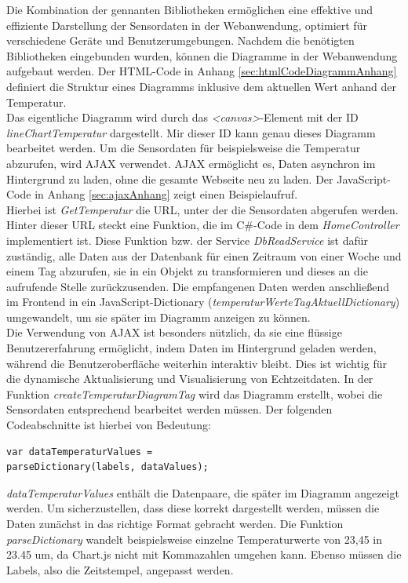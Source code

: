 \documentclass[conference]{IEEEtran}
\begin{document}
Die Kombination der gennanten Bibliotheken ermöglichen eine effektive und effiziente Darstellung der Sensordaten in der Webanwendung, optimiert für verschiedene Geräte und Benutzerumgebungen.
Nachdem die benötigten Bibliotheken eingebunden wurden, können die Diagramme in der Webanwendung aufgebaut werden. Der  HTML-Code in Anhang \ref{sec:htmlCodeDiagrammAnhang} definiert die Struktur eines Diagramms inklusive dem aktuellen Wert anhand der Temperatur. \\
Das eigentliche Diagramm wird durch das \textit{\textless canvas\textgreater{}}-Element mit der ID \textit{lineChartTemperatur} dargestellt. Mir dieser ID kann genau dieses Diagramm bearbeitet werden.
Um die Sensordaten für beispielsweise die Temperatur abzurufen, wird AJAX verwendet. AJAX ermöglicht es, Daten asynchron im Hintergrund zu laden, ohne die gesamte Webseite neu zu laden. Der JavaScript-Code in Anhang \ref{sec:ajaxAnhang} zeigt einen Beispielaufruf. \\
Hierbei ist \textit{GetTemperatur} die URL, unter der die Sensordaten abgerufen werden. Hinter dieser URL steckt eine Funktion, die im C\#-Code in dem \textit{HomeController} implementiert ist. Diese Funktion bzw. der Service \textit{DbReadService} ist dafür zuständig, alle Daten aus der Datenbank für einen Zeitraum von einer Woche und einem Tag abzurufen, sie in ein Objekt zu transformieren und dieses an die aufrufende Stelle zurückzusenden. Die empfangenen Daten werden anschließend im Frontend in ein JavaScript-Dictionary (\textit{temperaturWerteTagAktuellDictionary}) umgewandelt, um sie später im Diagramm anzeigen zu können. \\
Die Verwendung von AJAX ist besonders nützlich, da sie eine flüssige Benutzererfahrung ermöglicht, indem Daten im Hintergrund geladen werden, während die Benutzeroberfläche weiterhin interaktiv bleibt. Dies ist wichtig für die dynamische Aktualisierung und Visualisierung von Echtzeitdaten.
In der Funktion \textit{createTemperaturDiagramTag} wird das Diagramm erstellt, wobei die Sensordaten entsprechend bearbeitet werden müssen. Der folgenden Codeabschnitte ist hierbei von Bedeutung: 
\begin{verbatim}var dataTemperaturValues = 
parseDictionary(labels, dataValues); \end{verbatim}
\textit{dataTemperaturValues} enthält die Datenpaare, die später im Diagramm angezeigt werden. Um sicherzustellen, dass diese korrekt dargestellt werden, müssen die Daten zunächst in das richtige Format gebracht werden. Die Funktion \textit{parseDictionary} wandelt beispielsweise einzelne Temperaturwerte von 23,45 in 23.45 um, da Chart.js nicht mit Kommazahlen umgehen kann. Ebenso müssen die Labels, also die Zeitstempel, angepasst werden. \\
\end{document}
